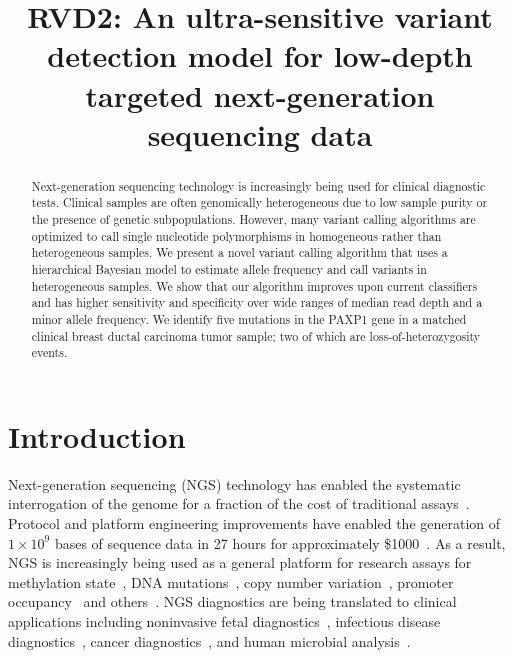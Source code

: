 \documentclass[11pt,reqno]{amsart}
\title[RVD2]{RVD2: An ultra-sensitive variant detection model for low-depth targeted next-generation sequencing data}
\author{}
\begin{document}

\begin{abstract}
Next-generation sequencing technology is increasingly being used for clinical diagnostic tests. Clinical samples are often genomically heterogeneous due to low sample purity or the presence of genetic subpopulations. However, many variant calling algorithms are optimized to call single nucleotide polymorphisms in homogeneous rather than heterogeneous samples. We present a novel variant calling algorithm that uses a hierarchical Bayesian model to estimate allele frequency and call variants in heterogeneous samples. We show that our algorithm improves upon current classifiers and has higher sensitivity and specificity over wide ranges of median read depth and a minor allele frequency. We identify five mutations in the PAXP1 gene in a matched clinical breast ductal carcinoma tumor sample; two of which are loss-of-heterozygosity events.

\end{abstract}

\maketitle

\section{Introduction}

Next-generation sequencing (NGS) technology has enabled the systematic interrogation of the genome for a fraction of the cost of traditional assays~\citep{Koboldt:2013kw}. Protocol and platform engineering improvements have enabled the generation of $1\times10^9$ bases of sequence data in 27 hours for approximately \$1000~\citep{Quail:2012hf}. As a result, NGS is increasingly being used as a general platform for research assays for methylation state~\citep{Laird:2010ab}, DNA mutations~\citep{Consortium:2013co}, copy number variation~\citep{Alkan:2009cr}, promoter occupancy~\citep{Ouyang:2009hc} and others~\citep{Rivera:2013ee}. NGS diagnostics are being translated to clinical applications including noninvasive fetal diagnostics~\citep{Kitzman:2012hea}, infectious disease diagnostics~\citep{Capobianchi:2012em}, cancer diagnostics~\citep{Navin:2010gu}, and human microbial analysis~\citep{Consortium:2013iz}. 
\end{document}
